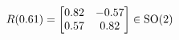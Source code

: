 \documentclass[preview]{standalone}
\begin{document}
\begin{align*}
\special{dvisvgm:raw <g id='unique000'>}R(0.61) = \begin{bmatrix} 0.82 & -0.57 \\ 0.57 & 0.82 \end{bmatrix} \in \text{SO}(2)\special{dvisvgm:raw </g>}
\end{align*}
\end{document}
